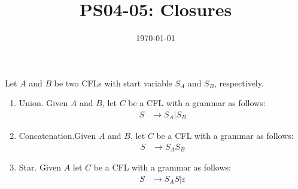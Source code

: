 \documentclass{article}
\title{PS04-05: Closures}
\date{\today}
\begin{document}
\maketitle

Let $A$ and $B$ be two CFLs with start variable $S_A$ and $S_B$, respectively.
\begin{enumerate}
	\item Union. Given $A$ and $B$, let $C$ be a CFL with a grammar as follows:
	\begin{align*}
	S &\rightarrow S_A | S_B
	\end{align*}
	\item Concatenation.Given $A$ and $B$, let $C$ be a CFL with a grammar as follows:
	\begin{align*}
	S &\rightarrow S_AS_B
	\end{align*}
	\item Star. Given $A$ let $C$ be a CFL with a grammar as follows:
	\begin{align*}
	S &\rightarrow S_AS |\varepsilon
	\end{align*}
\end{enumerate}
\end{document}
